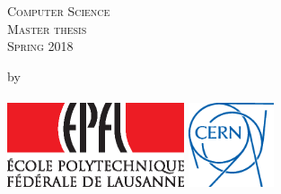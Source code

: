 \begin{titlepage}

\begin{center}
\textsc{\large Computer Science\\ Master thesis\\ Spring 2018}
\end{center}


\vspace{2cm}
\begin{center}
\linespread{1.3}\huge \bfseries \ttitle
\end{center}
\vspace{2cm}
\begin{center}
by \\[1cm]
\authornames\\[6cm]
\includegraphics[height=2.5cm]{./Images/EPFL.eps}
\hspace{1cm}
\includegraphics[height=2.5cm]{./Images/CERN.eps}
\vfill
\end{center}

\end{titlepage}
